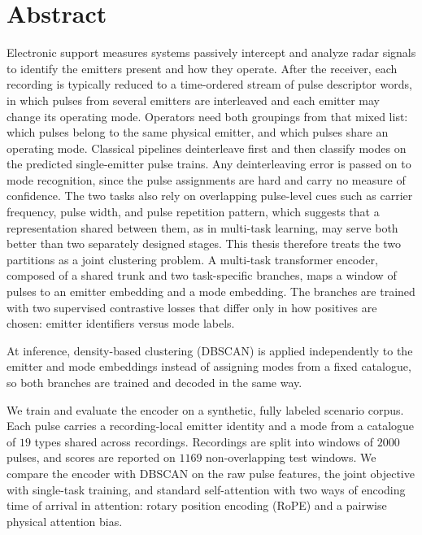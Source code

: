 \cleardoublepage%
%
\chapter*{Abstract}

Electronic support measures systems passively intercept and analyze radar signals to identify the emitters present and how they operate.
After the receiver, each recording is typically reduced to a time-ordered stream of pulse descriptor words, in which pulses from several emitters are interleaved and each emitter may change its operating mode.
Operators need both groupings from that mixed list: which pulses belong to the same physical emitter, and which pulses share an operating mode.
Classical pipelines deinterleave first and then classify modes on the predicted single-emitter pulse trains.
Any deinterleaving error is passed on to mode recognition, since the pulse assignments are hard and carry no measure of confidence.
The two tasks also rely on overlapping pulse-level cues such as carrier frequency, pulse width, and pulse repetition pattern, which suggests that a representation shared between them, as in multi-task learning, may serve both better than two separately designed stages.
This thesis therefore treats the two partitions as a joint clustering problem.
A multi-task transformer encoder, composed of a shared trunk and two task-specific branches, maps a window of pulses to an emitter embedding and a mode embedding.
The branches are trained with two supervised contrastive losses that differ only in how positives are chosen: emitter identifiers versus mode labels.

At inference, density-based clustering (DBSCAN) is applied independently to the emitter and mode embeddings instead of assigning modes from a fixed catalogue, so both branches are trained and decoded in the same way.

We train and evaluate the encoder on a synthetic, fully labeled scenario corpus.
Each pulse carries a recording-local emitter identity and a mode from a catalogue of $19$ types shared across recordings.
Recordings are split into windows of $2000$ pulses, and scores are reported on $1169$ non-overlapping test windows.
We compare the encoder with DBSCAN on the raw pulse features, the joint objective with single-task training, and standard self-attention with two ways of encoding time of arrival in attention: rotary position encoding (RoPE) and a pairwise physical attention bias.

